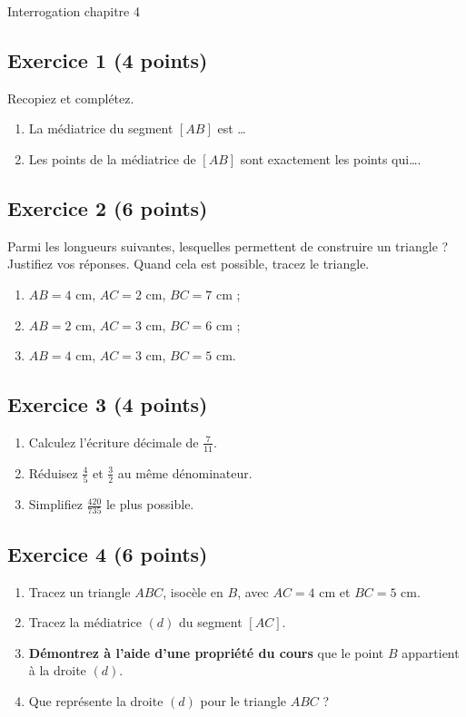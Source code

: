 \documentclass[14 pt]{extarticle}
\theoremstyle{plain}
\begin{document}
\newpage 


\begin{center}{\Large Interrogation chapitre 4}\\ 
 \end{center}
 
 \subsection*{Exercice 1 (4 points)}
 Recopiez et complétez. 
 \begin{enumerate}
 \item La médiatrice du segment $[AB]$ est \ldots
 \item Les points de la médiatrice de $[AB]$ sont exactement les points qui\ldots. 
 \end{enumerate}
 
 \subsection*{Exercice 2 (6 points)}
 
Parmi les longueurs suivantes, lesquelles permettent de construire un triangle ? Justifiez vos réponses. Quand cela est possible, tracez le triangle.
\begin{enumerate}
\item $AB = 4$ cm, $AC = 2$ cm, $BC = 7$ cm ;
\item $AB = 2$ cm, $AC = 3$ cm, $BC = 6$ cm ;
\item $AB = 4$ cm, $AC = 3$ cm, $BC = 5$ cm. 
\end{enumerate}


\subsection*{Exercice 3 (4 points)}
\begin{enumerate}
\item Calculez l'écriture décimale de $\frac7{11}$. 
\item Réduisez $\frac45$ et $\frac32$ au même dénominateur. 
\item Simplifiez $\frac{420}{735}$ le plus possible. 
\end{enumerate}


\subsection*{Exercice 4 (6 points)}
\begin{enumerate}
\item Tracez un triangle $ABC$, isocèle en $B$, avec $AC = 4$ cm et $BC = 5$ cm. 
\item Tracez la médiatrice $(d)$ du segment $[AC]$. 
\item \textbf{Démontrez à l'aide d'une propriété du cours} que le point $B$ appartient à la droite $(d)$. 
\item Que représente la droite $(d)$ pour le triangle $ABC$ ?
\end{enumerate}


 	
\end{document}
